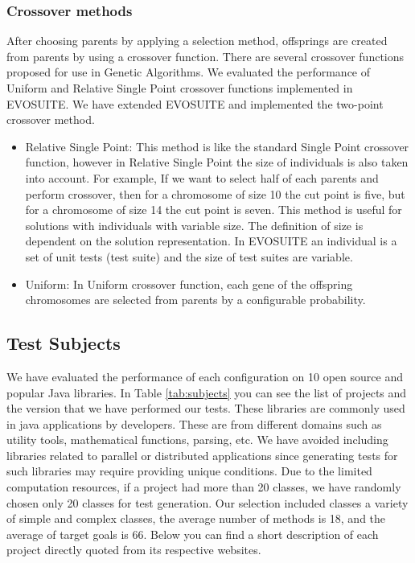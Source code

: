 \documentclass[sigconf]{acmart}
\begin{document}
\subsubsection{Crossover methods}
After choosing parents by applying a selection method, offsprings are created from parents by using a
crossover function. There are several crossover functions proposed for use in Genetic Algorithms. We evaluated
the performance of Uniform and Relative Single Point crossover functions implemented in EVOSUITE. We have 
extended EVOSUITE and implemented the two-point crossover method.
\begin{itemize}
  \item{Relative Single Point}: This method is like the standard Single Point crossover function,
  however in Relative Single Point the size of individuals is also taken into account. For example, If we want
  to select half of each parents and perform crossover, then for a chromosome of size 10 the cut point is five,
  but for a chromosome of size 14 the cut point is seven. This method is useful for solutions with individuals
  with variable size. The definition of size is dependent on the solution representation. In EVOSUITE
  an individual is a set of unit tests (test suite) and the size of test suites are variable.
  \item{Uniform}: In Uniform crossover function, each gene of the offspring chromosomes are selected
  from parents by a configurable probability.
\end{itemize}


\subsection{Test Subjects}
\label{testsubjects}
We have evaluated the performance of each configuration on 10 open source and popular Java libraries.
In Table \ref{tab:subjects} you can see the list of projects and the version that we have performed 
our tests. These libraries are commonly used in java applications by developers. These are 
from different domains such as utility tools, mathematical functions, parsing, etc. 
We have avoided including libraries related to parallel or distributed applications since
generating tests for such libraries may require providing unique conditions. Due to the limited computation resources,
if a project had more than 20 classes, we have randomly chosen only 20 classes for test generation.
Our selection included classes a variety of simple and complex classes, the average number of methods is 18, 
and the average of target goals is 66. Below you can find a short description of each project 
directly quoted from its respective websites.
\end{document}
